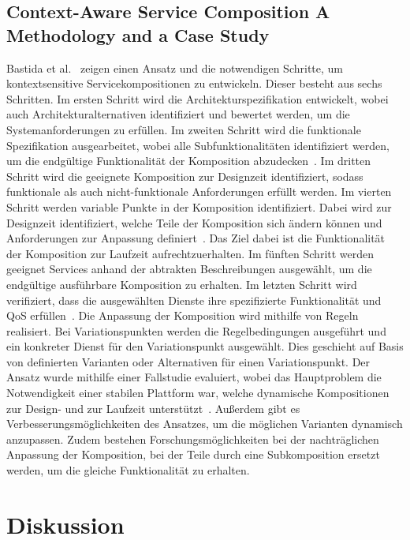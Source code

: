\documentclass[conference,compsoc]{IEEEtran}
\begin{document}
\subsection{Context-Aware Service Composition  A Methodology and a Case Study}
Bastida et al.~\cite{bastida2008context} zeigen einen Ansatz und die notwendigen Schritte, um kontextsensitive Servicekompositionen zu entwickeln. Dieser besteht aus sechs Schritten. Im ersten Schritt wird die Architekturspezifikation entwickelt, wobei auch Architekturalternativen identifiziert und bewertet werden, um die Systemanforderungen zu erfüllen. Im zweiten Schritt wird die funktionale Spezifikation ausgearbeitet, wobei alle Subfunktionalitäten identifiziert werden, um die endgültige Funktionalität der Komposition abzudecken~\cite{bastida2008context}. Im dritten Schritt wird die geeignete Komposition zur Designzeit identifiziert, sodass funktionale als auch nicht-funktionale Anforderungen erfüllt werden. Im vierten Schritt werden variable Punkte in der Komposition identifiziert. Dabei wird zur Designzeit identifiziert, welche Teile der Komposition sich ändern können und Anforderungen zur Anpassung definiert~\cite{bastida2008context}. Das Ziel dabei ist die Funktionalität der Komposition zur Laufzeit aufrechtzuerhalten. Im fünften Schritt werden geeignet Services anhand der abtrakten Beschreibungen ausgewählt, um die endgültige ausführbare Komposition zu erhalten. Im letzten Schritt wird verifiziert, dass die ausgewählten Dienste ihre spezifizierte Funktionalität und QoS erfüllen~\cite{bastida2008context}.
Die Anpassung der Komposition wird mithilfe von Regeln realisiert. Bei Variationspunkten werden die Regelbedingungen ausgeführt und ein konkreter Dienst für den Variationspunkt ausgewählt. Dies geschieht auf Basis von definierten Varianten oder Alternativen für einen Variationspunkt.
Der Ansatz wurde mithilfe einer Fallstudie evaluiert, wobei das Hauptproblem die Notwendigkeit einer stabilen Plattform war, welche dynamische Kompositionen zur Design- und zur Laufzeit unterstützt~\cite{bastida2008context}. Außerdem gibt es Verbesserungsmöglichkeiten des Ansatzes, um die möglichen Varianten dynamisch anzupassen. Zudem bestehen Forschungsmöglichkeiten bei der nachträglichen Anpassung der Komposition, bei der Teile durch eine Subkomposition ersetzt werden, um die gleiche Funktionalität zu erhalten.

\section{Diskussion}
\end{document}
